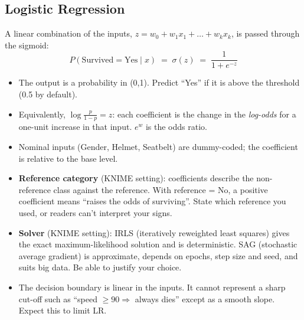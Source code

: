 \documentclass[11pt,a4paper]{article}
\begin{document}
\subsection{Logistic Regression}
A linear combination of the inputs, $z = w_0 + w_1x_1 + \dots + w_kx_k$, is passed through the
sigmoid:
\[
P(\text{Survived}=\text{Yes}\mid x) \;=\; \sigma(z) \;=\; \frac{1}{1+e^{-z}}
\]
\begin{center}
\end{center}
\begin{itemize}
  \item The output is a probability in (0,1). Predict ``Yes'' if it is above the threshold (0.5 by default).
  \item Equivalently, $\log\frac{p}{1-p} = z$: each coefficient is the change in the \emph{log-odds}
        for a one-unit increase in that input. $e^{w}$ is the odds ratio.
  \item Nominal inputs (Gender, Helmet, Seatbelt) are dummy-coded; the coefficient is relative to the
        base level.
  \item \textbf{Reference category} (KNIME setting): coefficients describe the non-reference class
        against the reference. With reference = No, a positive coefficient means ``raises the odds of
        surviving''. State which reference you used, or readers can't interpret your signs.
  \item \textbf{Solver} (KNIME setting): IRLS (iteratively reweighted least squares) gives the exact
        maximum-likelihood solution and is deterministic. SAG (stochastic average gradient) is
        approximate, depends on epochs, step size and seed, and suits big data. Be able to justify your choice.
  \item The decision boundary is linear in the inputs. It cannot represent a sharp cut-off such as
        ``speed $\geq 90 \Rightarrow$ always dies'' except as a smooth slope. Expect this to limit LR.
\end{itemize}
\end{document}
